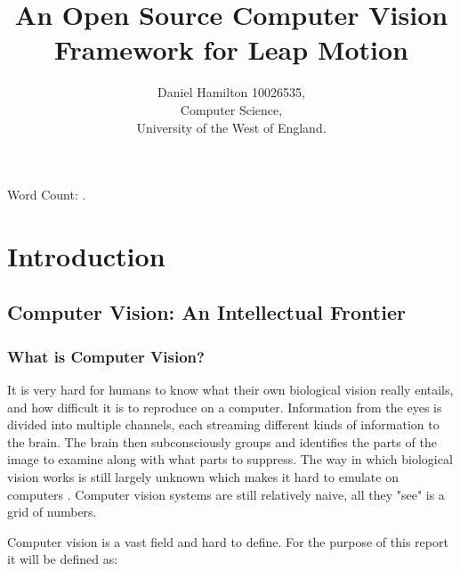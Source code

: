 \documentclass[11pt,oneside]{report}
\title{An Open Source Computer Vision Framework for Leap Motion}
\author{Daniel Hamilton 10026535,\\Computer Science,\\University of the West of England.}
\begin{document}
	\maketitle
	
	\begin{abstract}
	
	\end{abstract}	
	
	\renewcommand{\abstractname}{Acknowledgements}
	\begin{abstract}
	
	\end{abstract}
	
	\tableofcontents
	\listoffigures
	\listoftables
	\renewcommand{\lstlistlistingname}{List of Listings}
	\lstlistoflistings

	Word Count: \bashStdout.

	\chapter{Introduction}\label{chap:introduction}
		\section{Computer Vision: An Intellectual Frontier}
			\subsection{What is Computer Vision?}		
				
				It is very hard for humans to know what their own biological vision really entails, and how difficult it is to reproduce on a computer.
				Information from the eyes is divided into multiple channels, each streaming different kinds of information to the brain.
				The brain then subconsciously groups and identifies the parts of the image to examine along with what parts to suppress.
				The way in which biological vision works is still largely unknown which makes it hard to emulate on computers \cite[p. xi]{book:multiViewGeo}.				
				Computer vision systems are still relatively naive, all they "see" is a grid of numbers.%
				
				
				Computer vision is a vast field and hard to define.
				For the purpose of this report it will be defined as:
	
\end{document}
